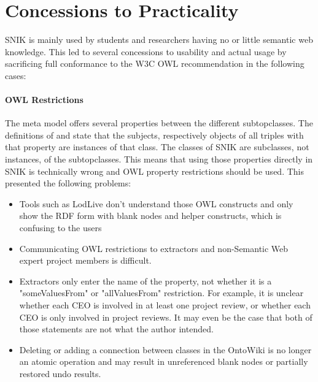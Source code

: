 \documentclass[sw]{iosart2x}
\begin{document}
\section{Concessions to Practicality}
SNIK is mainly used by students and researchers having no or little semantic web knowledge.
This led to several concessions to usability and actual usage by sacrificing full conformance to the W3C OWL recommendation in the following cases:

\paragraph{OWL Restrictions}
The meta model offers several properties between the different subtopclasses.
The definitions of  and  state that the subjects, respectively objects of all triples with that property are instances of that class.
The classes of SNIK are subclasses, not instances, of the subtopclasses.
This means that using those properties directly in SNIK is technically wrong and OWL property restrictions should be used.
This presented the following problems:
\begin{itemize}
\item Tools such as LodLive don't understand those OWL constructs and only show the RDF form with blank nodes and helper constructs, which is confusing to the users
\item Communicating OWL restrictions to extractors and non-Semantic Web expert project members is difficult.
\item Extractors only enter the name of the property, not whether it is a "someValuesFrom" or "allValuesFrom" restriction.
For example, it is unclear whether each CEO is involved in at least one project review, or whether each CEO is only involved in project reviews.
It may even be the case that both of those statements are not what the author intended.
\item Deleting or adding a connection between classes in the OntoWiki is no longer an atomic operation and may result in unreferenced blank nodes or partially restored undo results.
\end{itemize}
\end{document}
